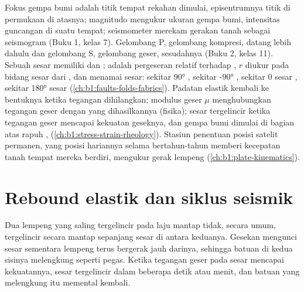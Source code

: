 \begin{recall}
Fokus gempa bumi adalah titik tempat rekahan dimulai, episentrumnya titik di permukaan di atasnya; magnitudo mengukur ukuran gempa bumi, intensitas guncangan di suatu tempat; seismometer merekam gerakan tanah sebagai seismogram (Buku 1, kelas 7). Gelombang P, gelombang kompresi, datang lebih dahulu dan gelombang S, gelombang geser, sesudahnya (Buku 2, kelas 11). Sebuah sesar memiliki  dan ;  adalah pergeseran  relatif terhadap ,  $r$ diukur pada bidang sesar dari , dan  menamai sesar: sekitar \ang{90} , sekitar \ang{-90} , sekitar 0 sesar , sekitar \ang{180} sesar  (\cref{ch:b1:faults-folds-fabrics}). Padatan elastik kembali ke bentuknya ketika tegangan dihilangkan; modulus geser $\mu$ menghubungkan tegangan geser dengan  yang dihasilkannya (fisika); sesar tergelincir ketika tegangan geser mencapai kekuatan geseknya, dan gempa bumi dimulai di bagian atas rapuh ,  (\cref{ch:b1:stress-strain-rheology}). Stasiun penentuan posisi satelit permanen, yang posisi hariannya selama bertahun-tahun memberi kecepatan tanah tempat mereka berdiri, mengukur gerak lempeng (\cref{ch:b1:plate-kinematics}).
\end{recall}

\section{Rebound elastik dan siklus seismik}\label{sec:b1:earthquake-source:cycle}

Dua lempeng yang saling tergelincir pada laju mantap tidak, secara umum, tergelincir secara mantap sepanjang sesar di antara keduanya. Gesekan mengunci sesar sementara lempeng terus bergerak jauh darinya, sehingga batuan di kedua sisinya melengkung seperti pegas. Ketika tegangan geser pada sesar mencapai kekuatannya, sesar tergelincir dalam beberapa detik atau menit, dan batuan yang melengkung itu memental kembali.

